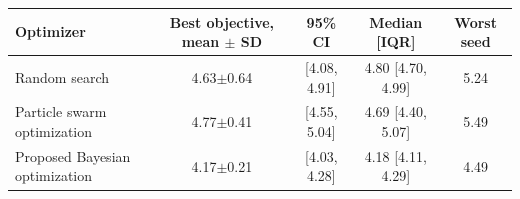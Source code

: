 \begin{tabularx}{\textwidth}{lCCCC}
\toprule
\textbf{Optimizer} & \textbf{Best objective, mean $\pm$ SD} & \textbf{95\% CI} & \textbf{Median [IQR]} & \textbf{Worst seed}\\
\midrule
Random search & 4.63$\pm$0.64 & [4.08, 4.91] & 4.80 [4.70, 4.99] & 5.24\\
Particle swarm optimization & 4.77$\pm$0.41 & [4.55, 5.04] & 4.69 [4.40, 5.07] & 5.49\\
Proposed Bayesian optimization & 4.17$\pm$0.21 & [4.03, 4.28] & 4.18 [4.11, 4.29] & 4.49\\
\bottomrule
\end{tabularx}